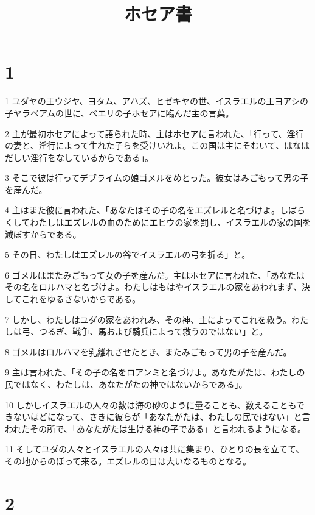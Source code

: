 

\title{ホセア書}


\chapter{1}

\par 1 ユダヤの王ウジヤ、ヨタム、アハズ、ヒゼキヤの世、イスラエルの王ヨアシの子ヤラベアムの世に、ベエリの子ホセアに臨んだ主の言葉。
\par 2 主が最初ホセアによって語られた時、主はホセアに言われた、「行って、淫行の妻と、淫行によって生れた子らを受けいれよ。この国は主にそむいて、はなはだしい淫行をなしているからである」。
\par 3 そこで彼は行ってデブライムの娘ゴメルをめとった。彼女はみごもって男の子を産んだ。
\par 4 主はまた彼に言われた、「あなたはその子の名をエズレルと名づけよ。しばらくしてわたしはエズレルの血のためにエヒウの家を罰し、イスラエルの家の国を滅ぼすからである。
\par 5 その日、わたしはエズレルの谷でイスラエルの弓を折る」と。
\par 6 ゴメルはまたみごもって女の子を産んだ。主はホセアに言われた、「あなたはその名をロルハマと名づけよ。わたしはもはやイスラエルの家をあわれまず、決してこれをゆるさないからである。
\par 7 しかし、わたしはユダの家をあわれみ、その神、主によってこれを救う。わたしは弓、つるぎ、戦争、馬および騎兵によって救うのではない」と。
\par 8 ゴメルはロルハマを乳離れさせたとき、またみごもって男の子を産んだ。
\par 9 主は言われた、「その子の名をロアンミと名づけよ。あなたがたは、わたしの民ではなく、わたしは、あなたがたの神ではないからである」。
\par 10 しかしイスラエルの人々の数は海の砂のように量ることも、数えることもできないほどになって、さきに彼らが「あなたがたは、わたしの民ではない」と言われたその所で、「あなたがたは生ける神の子である」と言われるようになる。
\par 11 そしてユダの人々とイスラエルの人々は共に集まり、ひとりの長を立てて、その地からのぼって来る。エズレルの日は大いなるものとなる。

\chapter{2}

